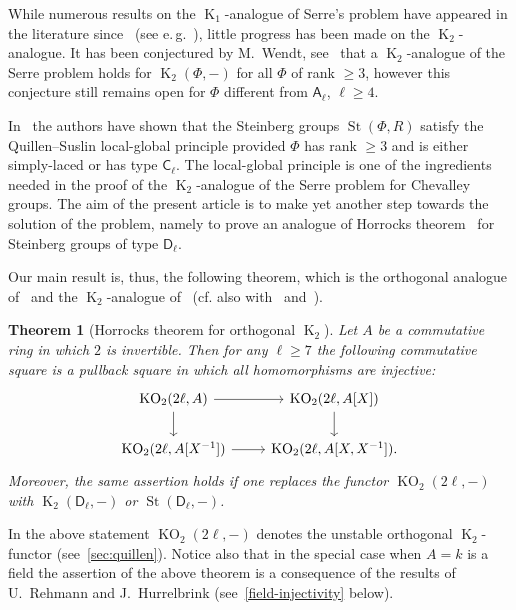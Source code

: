 \documentclass[10pt,a4paper,twoside]{article}
\newtheorem{theorem}{Theorem}
\theoremstyle{remark}
\theoremstyle{definition}
\numberwithin{lemma}{section}
\numberwithin{prop}{section}
\numberwithin{corollary}{section}
\numberwithin{externaltheorem}{section}
\DeclareMathOperator{\St}{St}
\DeclareMathOperator{\K}{K}
\DeclareMathOperator{\KO}{KO}
\newcommand{\inv}{^{-1}}
\newcommand{\rA}{\mathsf{A}}
\newcommand{\rC}{\mathsf{C}}
\newcommand{\rD}{\mathsf{D}}
\numberwithin{equation}{section}
\begin{document}
While numerous results on the $\K_1$-analogue of Serre's problem have appeared in the literature since~\cite{Su77} (see e.\,g.~\cite{Su82, Abe83, St-poly, St-Ded}), little progress has been made on the $\K_2$-analogue. It has been conjectured by M.~Wendt, see~\cite[Vermutung~6.22]{Vo11} that a $\K_2$-analogue of the Serre problem holds for $\K_2(\Phi, -)$ for all $\Phi$ of rank $\geq 3$, however this conjecture still remains open for $\Phi$ different from $\rA_\ell$, $\ell \geq 4$.

In~\cite{LS17,La18} the authors have shown that the Steinberg groups $\St(\Phi, R)$ satisfy the Quillen--Suslin local-global principle provided $\Phi$ has rank $\geq 3$ and is either simply-laced or has type $\rC_\ell$. The local-global principle is one of the ingredients needed in the proof of the $\K_2$-analogue of the Serre problem for Chevalley groups. The aim of the present article is to make yet another step towards the solution of the problem, namely to prove an analogue of Horrocks theorem~\cite{Ho64} for Steinberg groups of type $\rD_\ell$.

Our main result is, thus, the following theorem, which is the orthogonal analogue of~\cite[Theorem~5.1]{Tu83} and the $\K_2$-analogue of~\cite[Theorem~6.8]{Su82} (cf. also with~\cite[Theorem~VI.5.2]{Lam10} and~\cite[Theorem~1.1]{St-poly}).
\begin{theorem}[Horrocks theorem for orthogonal $\K_2$]\label{thm:main} Let $A$ be a commutative ring in which $2$ is invertible. Then for any $\ell \geq 7$ the following commutative square is a pullback square in which all homomorphisms are injective:
\[\begin{tikzcd} \KO_2(2\ell, A) \arrow{r} \arrow{d} & \KO_2(2\ell, A[X]) \arrow{d} \\ \KO_2(2\ell, A[X\inv]) \arrow{r} & \KO_2(2\ell, A[X, X\inv]). \end{tikzcd}\]
Moreover, the same assertion holds if one replaces the functor $\KO_2(2\ell, -)$ with $\K_2(\rD_\ell, -)$ or $\St(\rD_\ell, -)$. \end{theorem}
In the above statement $\KO_2(2\ell, -)$ denotes the unstable orthogonal $\K_2$-functor (see~\cref{sec:quillen}). Notice also that in the special case when $A=k$ is a field the assertion of the above theorem is a consequence of the results of U.~Rehmann and J.~Hurrelbrink (see~\cref{field-injectivity} below).
\end{document}
